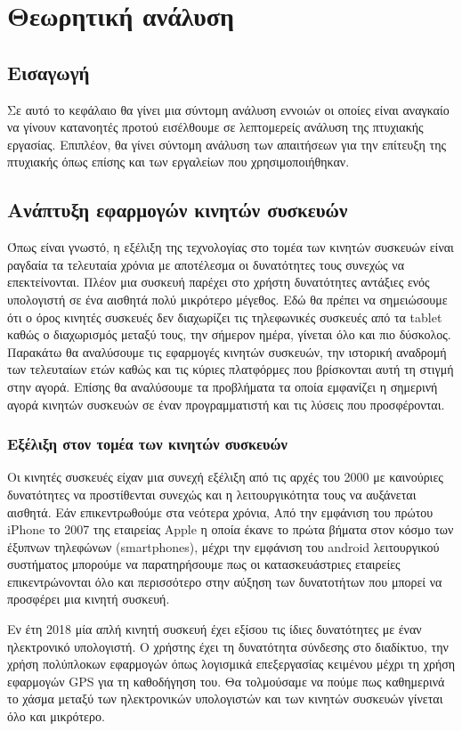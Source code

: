 \chapter{Θεωρητική ανάλυση}

\section{Εισαγωγή}
Σε αυτό το κεφάλαιο θα γίνει μια σύντομη ανάλυση εννοιών οι οποίες είναι αναγκαίο να γίνουν κατανοητές προτού εισέλθουμε σε λεπτομερείς ανάλυση της πτυχιακής εργασίας. Επιπλέον, θα γίνει σύντομη ανάλυση των απαιτήσεων για την επίτευξη της πτυχιακής όπως επίσης και των εργαλείων που χρησιμοποιήθηκαν. 

\section{Ανάπτυξη εφαρμογών κινητών συσκευών}
Όπως είναι γνωστό, η εξέλιξη της τεχνολογίας στο τομέα των κινητών συσκευών είναι ραγδαία τα τελευταία χρόνια με αποτέλεσμα οι δυνατότητες τους συνεχώς να επεκτείνονται. Πλέον μια συσκευή παρέχει στο χρήστη δυνατότητες αντάξιες ενός υπολογιστή σε ένα αισθητά πολύ μικρότερο μέγεθος. Εδώ θα πρέπει να σημειώσουμε ότι ο όρος κινητές συσκευές δεν διαχωρίζει τις τηλεφωνικές συσκευές από τα tablet καθώς ο διαχωρισμός μεταξύ τους, την σήμερον ημέρα, γίνεται όλο και πιο δύσκολος. Παρακάτω θα αναλύσουμε τις εφαρμογές κινητών συσκευών, την ιστορική αναδρομή των τελευταίων ετών καθώς και τις κύριες πλατφόρμες που βρίσκονται αυτή τη στιγμή στην αγορά. Επίσης θα αναλύσουμε τα προβλήματα τα οποία εμφανίζει η σημερινή αγορά κινητών συσκευών σε έναν προγραμματιστή και τις λύσεις που προσφέρονται.

\subsection{Εξέλιξη στον τομέα των κινητών συσκευών}
Οι κινητές συσκευές είχαν μια συνεχή εξέλιξη από τις αρχές του 2000 με καινούριες δυνατότητες να προστίθενται συνεχώς και η λειτουργικότητα τους να αυξάνεται αισθητά. Εάν επικεντρωθούμε στα νεότερα χρόνια, Από την εμφάνιση του πρώτου iPhone το 2007 της εταιρείας Αpple η οποία έκανε το πρώτα βήματα στον κόσμο των έξυπνων τηλεφώνων (smartphones), μέχρι την εμφάνιση του android λειτουργικού συστήματος μπορούμε να παρατηρήσουμε πως οι κατασκευάστριες εταιρείες επικεντρώνονται όλο και περισσότερο στην αύξηση των δυνατοτήτων που μπορεί να προσφέρει μια κινητή συσκευή. 
\par
Εν έτη 2018 μία απλή κινητή συσκευή έχει εξίσου τις ίδιες δυνατότητες με έναν ηλεκτρονικό υπολογιστή. Ο χρήστης έχει τη δυνατότητα σύνδεσης στο διαδίκτυο, την χρήση πολύπλοκων εφαρμογών όπως λογισμικά επεξεργασίας κειμένου μέχρι τη χρήση εφαρμογών GPS για τη καθοδήγηση του. Θα τολμούσαμε να πούμε πως καθημερινά το χάσμα μεταξύ των ηλεκτρονικών υπολογιστών και των κινητών συσκευών γίνεται όλο και μικρότερο.

